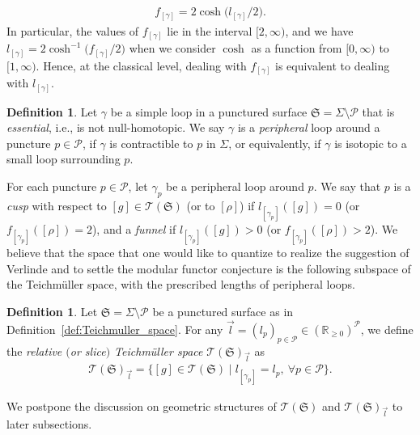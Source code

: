 \documentclass[10pt,a4paper]{amsart}
\numberwithin{equation}{section}
\theoremstyle{definition}
\newtheorem{Definition}[Theorem]{Definition}
\begin{document}
\begin{align}
\label{eq:trace_of_monodromy_as_length}
f_{[\gamma]} = 2\cosh\bigl(l_{[\gamma]}/2\bigr).
\end{align}
In particular, the values of $f_{[\gamma]}$ lie in the interval $[2,\infty)$, and we have $l_{[\gamma]} = 2 \cosh^{-1} \bigl( f_{[\gamma]}/2\bigr)$ when we consider $\cosh$ as a function from $[0,\infty)$ to $[1,\infty)$. Hence, at the classical level, dealing with $f_{[\gamma]}$ is equivalent to dealing with $l_{[\gamma]}$.
\begin{Definition}\label{def:essential_and_peripheral}
Let $\gamma$ be a simple loop in a punctured surface $\mathfrak{S} = \Sigma\setminus\mathcal{P}$ that is {\em essential}, i.e., is not null-homotopic. We say $\gamma$ is a {\em peripheral} loop around a puncture $p \in \mathcal{P}$, if $\gamma$ is contractible to $p$ in $\Sigma$, or equivalently, if $\gamma$ is isotopic to a small loop surrounding $p$.
\end{Definition}
For each puncture $p \in \mathcal{P}$, let $\gamma_p$ be a peripheral loop around $p$. We say that $p$ is a {\em cusp} with respect to $[g] \in \mathscr{T}(\mathfrak{S})$ (or to $[\rho]$) if $l_{[\gamma_p]}([g])=0$ (or $f_{[\gamma_p]}([\rho])=2$), and a {\em funnel} if $l_{[\gamma_p]}([g])>0$ (or $f_{[\gamma_p]}([\rho])>2$).
We believe that the space that one would like to quantize to realize the suggestion of Verlinde \cite{Verlinde} and to settle the modular functor conjecture \cite{F97,FG09} is the following subspace of the Teichm\"uller space, with the prescribed lengths of peripheral loops.
\begin{Definition}
\label{def:relative_Teichmuller_space}
Let $\mathfrak{S} = \Sigma\setminus \mathcal{P}$ be a punctured surface as in Definition~\ref{def:Teichmuller_space}. For any $\vec{l} = (l_p)_{p \in \mathcal{P}} \in (\mathbb{R}_{\ge 0})^\mathcal{P}$, we define the {\em relative $($or slice$)$ Teichm\"uller space} $\mathscr{T}(\mathfrak{S})_{\vec{l}}$ as
\begin{align*}
\mathscr{T}(\mathfrak{S})_{\vec{l}} = \bigl\{[g] \in \mathscr{T}(\mathfrak{S}) \mid l_{[\gamma_p]} = l_p, ~ \forall p \in \mathcal{P} \bigr\}.
\end{align*}
\end{Definition}
We postpone the discussion on geometric structures of $\mathscr{T}(\mathfrak{S})$ and $\mathscr{T}(\mathfrak{S})_{\vec{l}}$ to later subsections.
\end{document}
